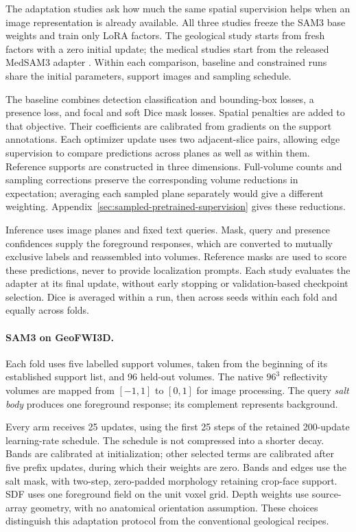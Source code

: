 \documentclass[12pt,a4paper]{article}
\begin{document}
The adaptation studies ask how much the same spatial supervision helps
when an image representation is already available. All three studies
freeze the SAM3 base weights and train only LoRA factors. The geological
study starts from fresh factors with a zero initial update; the medical
studies start from the released MedSAM3 adapter
\cite{carion2025sam3,liu2025medsam3}. Within each comparison, baseline and
constrained runs share the initial parameters, support images and
sampling schedule.

The baseline combines detection classification and bounding-box losses,
a presence loss, and focal and soft Dice mask losses. Spatial penalties
are added to that objective. Their coefficients are calibrated from
gradients on the support annotations. Each optimizer update uses two
adjacent-slice pairs, allowing edge supervision to compare predictions
across planes as well as within them. Reference supports are constructed
in three dimensions. Full-volume counts and sampling corrections
preserve the corresponding volume reductions in expectation; averaging
each sampled plane separately would give a different weighting.
Appendix~\ref{sec:sampled-pretrained-supervision} gives these reductions.

Inference uses image planes and fixed text queries. Mask, query and
presence confidences supply the foreground responses, which are
converted to mutually exclusive labels and reassembled into volumes.
Reference masks are used to score these predictions, never to provide
localization prompts. Each study evaluates the adapter at its final
update, without early stopping or validation-based checkpoint selection.
Dice is averaged within a run, then across seeds within each fold and
equally across folds.

\paragraph{SAM3 on GeoFWI3D.}\label{sec:sam3-methods}
Each fold uses five labelled support volumes, taken from the beginning
of its established support list, and 96 held-out volumes. The native
$96^3$ reflectivity volumes are mapped from $[-1,1]$ to $[0,1]$ for
image processing. The query \emph{salt body} produces one foreground
response; its complement represents background.

Every arm receives 25 updates, using the first 25 steps of the retained
200-update learning-rate schedule. The schedule is not compressed into
a shorter decay. Bands are calibrated at initialization; other selected
terms are calibrated after five prefix updates, during which their
weights are zero. Bands and edges use the salt mask, with two-step,
zero-padded morphology retaining crop-face support. SDF uses one
foreground field on the unit voxel grid. Depth weights use source-array
geometry, with no anatomical orientation assumption. These choices
distinguish this adaptation protocol from the conventional geological
recipes.
\end{document}
